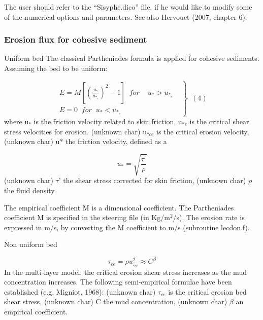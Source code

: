 The user should refer to the ``Sisyphe.dico'' file, if he would like to
modify some of the numerical options and parameters. See also Hervouet
(2007, chapter 6).

\subsubsection{Erosion flux for cohesive sediment}

Uniform bed\newline
The classical Partheniades formula is applied for cohesive sediments.
Assuming the bed to be uniform: \hspace{5mm}

\begin{equation*}
\left. 
\begin{array}{l}
E=M\left[ \left( \frac{u_{^*} }{u_{*_e}} \right)^2 -1\right]
\;\;for\quad\,u_{*} >u_{*_e} \;\;\, \\ 
E=0\;\;for\;\;u_{*} <u_{*_e}%
\end{array}
\right\} \;\;(4) 
\end{equation*}%
\hspace{5mm} where u$_{*}$ is the friction velocity related to skin
friction, u$_{*e}$ is the critical shear stress velocities for erosion. 
\newline
(unknown char)\hspace{5mm} u$_{*ce}$ is the critical erosion velocity, 
\newline
(unknown char)\hspace{5mm} u* the friction velocity, defined as a

\begin{equation*}
u_{*} =\sqrt{\frac{\tau ^{\prime }_{} }{\rho } } 
\end{equation*}%
(unknown char)\hspace{5mm} $\tau$' the shear stress corrected for skin
friction,\newline
(unknown char)\hspace{5mm} $\rho$ the fluid density.

The empirical coefficient M is a dimensional coefficient. The Partheniades
coefficient M is specified in the steering file (in Kg/m$^{2}$/s). The
erosion rate is expressed in m/s, by converting the M coefficient to m/s
(subroutine lecdon.f).

Non uniform bed\newline

\begin{equation*}
\tau _{ce} =\rho u_{_{*ce} }^{2} \approx C^{\beta } 
\end{equation*}%
In the multi-layer model, the critical erosion shear stress increases as the
mud concentration increases. The following semi-empirical formulae have been
established (e.g. Migniot, 1968):\newline
(unknown char)\hspace{5mm} $\tau$$_{ce}$ is the critical erosion bed shear
stress, \newline
(unknown char)\hspace{5mm} C the mud concentration, \newline
(unknown char)\hspace{5mm} $\beta$ an empirical coefficient.

